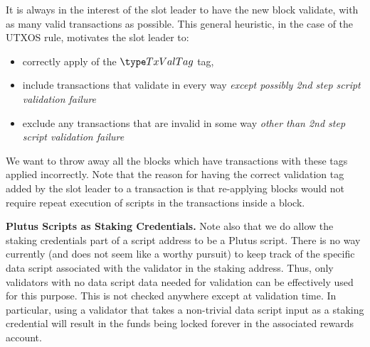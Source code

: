 It is always in the interest of the slot leader to have the new block validate,
with as many valid transactions as possible. This general heuristic,
in the case of the UTXOS rule, motivates the
slot leader to:

\begin{itemize}
  \item correctly apply of the $\TxValTag$ tag,
  \item include transactions that validate in every way
  \textit{except possibly 2nd step script validation failure}
  \item exclude any transactions that are invalid
in some way \textit{other than 2nd step script validation failure}
\end{itemize}

We want to
throw away all the blocks which have transactions with these tags
applied incorrectly.
Note that the reason for having the correct validation tag added by the slot leader
to a transaction is that re-applying blocks would not require repeat
execution of scripts in the transactions inside a block.

\textbf{Plutus Scripts as Staking Credentials.}
Note also that we do allow the staking credentials part of a script
address to be a Plutus script. There is no way currently (and does not seem
like a worthy pursuit) to keep track of the specific data script associated with
the validator in the staking address. Thus, only validators with no
data script data needed for validation can be effectively used for this purpose.
This is not checked anywhere except at validation time. In particular,
using a validator that takes a non-trivial data script input as a staking credential
will result in the funds being locked forever in the associated rewards account.

